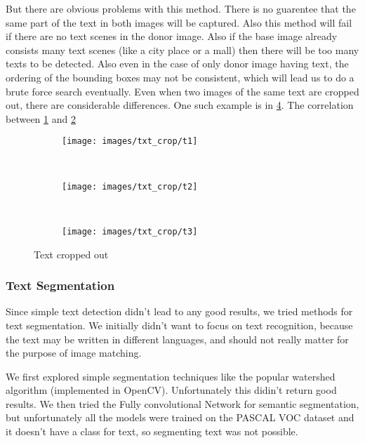 \documentclass{article}
\begin{document}
But there are obvious problems with this method. There is no guarentee that the same part of the text in both images will be captured. Also this method will fail if there are no text scenes in the donor image. Also if the base image already consists many text scenes (like a city place or a mall) then there will be too many texts to be detected. Also even in the case of only donor image having text, the ordering of the bounding boxes may not be consistent, which will lead us to do a brute force search eventually. Even when two images of the same text are cropped out, there are considerable differences. One such example is in \ref{fig:txt_l}. The correlation between \ref{fig:t1} and \ref{fig:t2}

\begin{figure}[H]
  \centering
  \begin{subfigure}[H]{0.1\linewidth}
    \texttt{[image: images/txt\_crop/t1]}
    \caption{}
    \label{fig:t1}
  \end{subfigure}
  ~
  \begin{subfigure}[H]{0.1\linewidth}
    \texttt{[image: images/txt\_crop/t2]}
    \caption{}
    \label{fig:t2}
  \end{subfigure}
  ~
  \begin{subfigure}[H]{0.1\linewidth}
    \texttt{[image: images/txt\_crop/t3]}
    \caption{}
    \label{fig:t3}
  \end{subfigure}
  \caption{Text cropped out}
  \label{fig:txt_l}
\end{figure}

\subsubsection{Text Segmentation}
Since simple text detection didn't lead to any good results, we tried methods for text segmentation. We initially didn't want to focus on text recognition, because the text may be written in different languages, and should not really matter for the purpose of image matching.

We first explored simple segmentation techniques like the popular watershed algorithm (implemented in OpenCV)\cite{opecv}. Unfortunately this didin't return good results. We then tried the Fully convolutional Network for semantic segmentation\cite{Long_2015_CVPR}, but unfortunately all the models were trained on the PASCAL VOC dataset \cite{Everingham10} and it doesn't have a class for text, so segmenting text was not possible.
\end{document}
